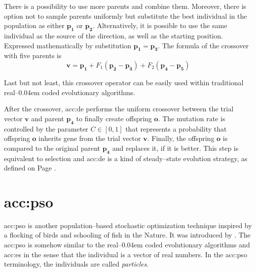 There is a possibility to use more parents and combine them. Moreover, there is option not to sample parents uniformly but substitute the best individual in the population as either $\mathbf{p_1}$ or $\mathbf{p_2}$. Alternatively, it is possible to use the same individual as the source of the direction, as well as the starting position. Expressed mathematically by substitution $\mathbf{p_1} = \mathbf{p_3}$. The formula of the crossover with five parents is
$$
\mathbf{v} = \mathbf{p_1} + F_1\left( \mathbf{p_2} - \mathbf{p_3} \right) + F_2\left( \mathbf{p_4} - \mathbf{p_5} \right)
$$

Last but not least, this crossover operator can be easily used within traditional real--\kern0.04em coded evolutionary algorithms.

After the crossover, \acrshort{acc:de} performs the uniform crossover between the trial vector $\mathbf{v}$ and parent $\mathbf{p_4}$ to finally create offspring $\mathbf{o}$. The mutation rate is controlled by the parameter $C\in\left[0,1\right]$ that represents a probability that offspring $\mathbf{o}$ inherits gene from the trial vector $\mathbf{v}$. Finally, the offspring $\mathbf{o}$ is compared to the original parent $\mathbf{p_4}$ and replaces it, if it is better. This step is equivalent to selection and \acrshort{acc:de} is a kind of steady--state evolution strategy, as defined on Page \pageref{enum:steadystate}.




\section{\texorpdfstring{\acrlong*{acc:pso}}{Particle Swarm Optimization}}

\acrfull{acc:pso} is another population--based stochastic optimization technique inspired by a flocking of birds and schooling of fish in the Nature. It was introduced by \citet*{PSOOriginal}. The \acrshort{acc:pso} is somehow similar to the real--\kern0.04em coded evolutionary algorithms and \acrshort{acc:es} in the sense that the individual is a vector of real numbers. In the \acrshort{acc:pso} terminology, the individuals are called \emph{particles}.

